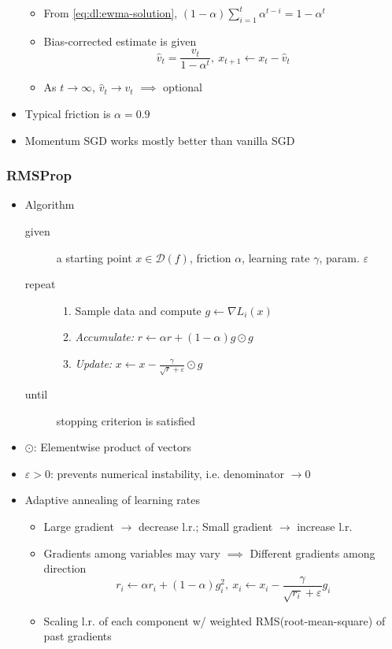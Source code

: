 \begin{itemize}
\begin{itemize}
        \item From \ref{eq:dl:ewma-solution}, $(1-\alpha)\sum_{i=1}^t\alpha^{t-i}=1-\alpha^t$
        \item Bias-corrected estimate is given
        \begin{equation}
            \hat{v}_t=\frac{v_t}{1-\alpha^t},~x_{t+1}\leftarrow x_t-\hat{v}_t
        \end{equation}
        \item As $t\to\infty$, $\hat{v}_t\to v_t$ $\implies$ optional
    \end{itemize}
    \item Typical friction is $\alpha=0.9$
    \item Momentum SGD works mostly better than vanilla SGD
\end{itemize}

\subsubsection*{RMSProp}
\begin{itemize}
    \item Algorithm
    \begin{description}
        \item[given] a starting point $x\in\mathcal{D}(f)$, friction $\alpha$, learning rate $\gamma$, param. $\varepsilon$
        \item[repeat] \phantom{}
        \begin{enumerate}
            \item Sample data and compute $g\leftarrow\nabla L_i(x)$
            \item \textit{Accumulate:} $r\leftarrow\alpha r+(1-\alpha)g\odot g$
            \item \textit{Update:} $x\leftarrow x-\frac{\gamma}{\sqrt{r}+\varepsilon}\odot g$
        \end{enumerate}
        \item[until] stopping criterion is satisfied
    \end{description}
    \item $\odot$: Elementwise product of vectors
    \item $\varepsilon>0$: prevents numerical instability, i.e. denominator $\to 0$
    \item Adaptive annealing of learning rates
    \begin{itemize}
        \item Large gradient $\to$ decrease l.r.; Small gradient $\to$ increase l.r.
        \item Gradients among variables may vary $\implies$ Different gradients among direction
        \begin{equation}
            r_i\leftarrow\alpha r_i+(1-\alpha)g_i^2,~x_i\leftarrow x_i-\frac{\gamma}{\sqrt{r_i}+\varepsilon}g_i
        \end{equation}
        \item Scaling l.r. of each component w/ weighted RMS(root-mean-square) of past gradients
    \end{itemize}
\end{itemize}

